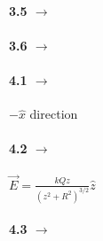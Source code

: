 \documentclass[11pt]{article}
\begin{document}
\begin{spacing}{0.5}
\paragraph{3.5 $\rightarrow$} 
\paragraph{3.6 $\rightarrow$} 

\paragraph{4.1 $\rightarrow$} $-\hat{x}$ direction
\paragraph{4.2 $\rightarrow$} $\vec{E} = \frac{kQz}{(z^2 + R^2)^{3/2}}\hat{z}$
\paragraph{4.3 $\rightarrow$} 

\end{spacing}
\end{document}
